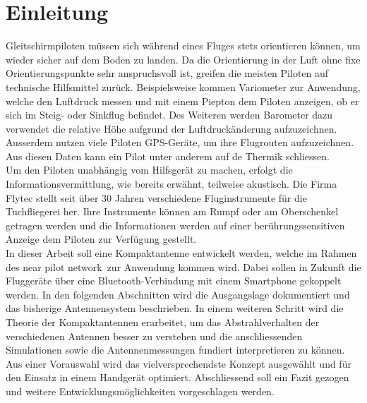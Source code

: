 \newpage
\chapter{Einleitung}

Gleitschirmpiloten müssen sich während eines Fluges stets orientieren können, um wieder sicher auf dem Boden zu landen. Da die Orientierung in der Luft ohne fixe Orientierungspunkte sehr anspruchsvoll ist, greifen die meisten Piloten auf technische Hilfsmittel zurück. Beispielsweise kommen Variometer zur Anwendung, welche den Luftdruck messen und mit einem Piepton dem Piloten anzeigen, ob er sich im Steig- oder Sinkflug befindet. Des Weiteren werden Barometer dazu verwendet die relative Höhe aufgrund der Luftdruckänderung aufzuzeichnen. Ausserdem nutzen viele Piloten GPS-Geräte, um ihre Flugrouten aufzuzeichnen. Aus diesen Daten kann ein Pilot unter anderem auf de Thermik schliessen.\\ Um den Piloten unabhängig vom Hilfsgerät zu machen, erfolgt die Informationsvermittlung, wie bereits erwähnt, teilweise akustisch. Die Firma Flytec stellt seit über 30 Jahren verschiedene Fluginstrumente für die Tuchfliegerei her. Ihre Instrumente können am Rumpf oder am Oberschenkel getragen werden und die Informationen werden auf einer berührungssensitiven Anzeige dem Piloten zur Verfügung gestellt.\\


In dieser Arbeit soll eine Kompaktantenne entwickelt werden, welche im Rahmen des \glqq near pilot network\grqq \ zur Anwendung kommen wird. Dabei sollen in Zukunft die Fluggeräte über eine Bluetooth-Verbindung mit einem Smartphone gekoppelt werden. In den folgenden Abschnitten wird die Ausgangslage dokumentiert und das bisherige Antennensystem beschrieben. In einem weiteren Schritt wird die Theorie der Kompaktantennen erarbeitet, um das Abstrahlverhalten der verschiedenen Antennen besser zu verstehen und die anschliessenden Simulationen sowie die Antennenmessungen fundiert interpretieren zu können. Aus einer Vorauswahl wird das vielversprechendste Konzept ausgewählt und für den Einsatz in einem Handgerät optimiert. Abschliessend soll ein Fazit gezogen und weitere Entwicklungsmöglichkeiten vorgeschlagen werden.

